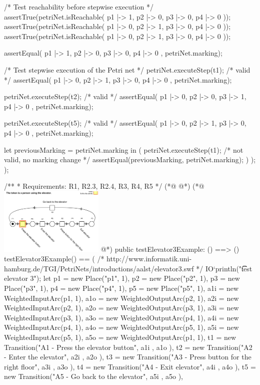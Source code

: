 \begin{vdmpp}
      /* Test reachability before stepwise execution */
      assertTrue(petriNet.isReachable({ p1 |-> 1, p2 |-> 0, p3 |-> 0, p4 |-> 0 }));
      assertTrue(petriNet.isReachable({ p1 |-> 0, p2 |-> 1, p3 |-> 0, p4 |-> 0 }));
      assertTrue(petriNet.isReachable({ p1 |-> 0, p2 |-> 1, p3 |-> 0, p4 |-> 0 }));

      assertEqual({ p1 |-> 1, p2 |-> 0, p3 |-> 0, p4 |-> 0 }, petriNet.marking);

      /* Test stepwise execution of the Petri net */
      petriNet.executeStep(t1); /* valid */
      assertEqual({ p1 |-> 0, p2 |-> 1, p3 |-> 0, p4 |-> 0 }, petriNet.marking);

      petriNet.executeStep(t2); /* valid */
      assertEqual({ p1 |-> 0, p2 |-> 0, p3 |-> 1, p4 |-> 0 }, petriNet.marking);

      petriNet.executeStep(t5); /* valid */
      assertEqual({ p1 |-> 0, p2 |-> 1, p3 |-> 0, p4 |-> 0 }, petriNet.marking);

      let previousMarking = petriNet.marking in (
        petriNet.executeStep(t1); /* not valid, no marking change */
        assertEqual(previousMarking, petriNet.marking);
      )
    );
  );

  /**
   * Requirements: R1, R2.3, R2.4, R3, R4, R5
   */
(*@
\label{testElevator3Example:118}
@*)
(*@
\includegraphics[width=5cm]{specification/elevator3.png}
@*)
  public testElevator3Example: () ==> ()
  testElevator3Example() == (
    /* http://www.informatik.uni-hamburg.de/TGI/PetriNets/introductions/aalst/elevator3.swf */
    IO`println("\t\t test elevator 3");
    let p1 = new Place("p1", 1),
     p2 = new Place("p2", 1),
     p3 = new Place("p3", 1),
     p4 = new Place("p4", 1),
     p5 = new Place("p5", 1),
     a1i = new WeightedInputArc(p1,  1),
     a1o = new WeightedOutputArc(p2, 1),
     a2i = new WeightedInputArc(p2, 1),
     a2o = new WeightedOutputArc(p3, 1),
     a3i = new WeightedInputArc(p3, 1),
     a3o = new WeightedOutputArc(p4, 1),
     a4i = new WeightedInputArc(p4, 1),
     a4o = new WeightedOutputArc(p5, 1),
     a5i = new WeightedInputArc(p5, 1),
     a5o = new WeightedOutputArc(p1, 1),
     t1 = new Transition("A1 - Press the elevator button", { a1i }, { a1o }),
     t2 = new Transition("A2 - Enter the elevator", { a2i }, { a2o }),
     t3 = new Transition("A3 - Press button for the right floor", { a3i }, { a3o }),
     t4 = new Transition("A4 - Exit elevator", { a4i }, { a4o }),
     t5 = new Transition("A5 - Go back to the elevator", { a5i }, { a5o }),


\end{vdmpp}
